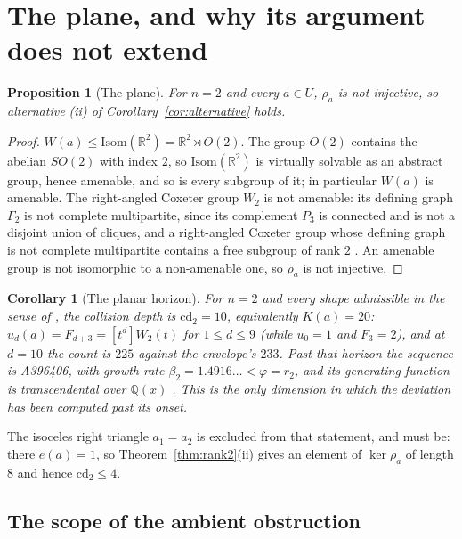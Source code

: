 \documentclass[11pt,a4paper]{article}
\newcommand{\R}{\mathbb{R}}
\newcommand{\Q}{\mathbb{Q}}
\newcommand{\Isom}{\mathrm{Isom}}
\newcommand{\cd}{\mathrm{cd}}
\newtheorem{corollary}[theorem]{Corollary}
\newtheorem{proposition}[theorem]{Proposition}
\theoremstyle{definition}
\theoremstyle{remark}
\theoremstyle{plain}
\begin{document}
\section{The plane, and why its argument does not extend}\label{sec:plane}

\begin{proposition}[The plane]\label{prop:plane}
For $n=2$ and every $a\in U$, $\rho_a$ is not injective, so alternative (ii) of
Corollary~\ref{cor:alternative} holds.
\end{proposition}

\begin{proof}
$W(a)\le\Isom(\R^2)=\R^2\rtimes O(2)$. The group $O(2)$ contains the abelian $SO(2)$ with index
$2$, so $\Isom(\R^2)$ is virtually solvable as an abstract group, hence amenable, and so is
every subgroup of it; in particular $W(a)$ is amenable. The right-angled Coxeter group $W_2$ is
not amenable: its defining graph $\Gamma_2$ is not complete multipartite, since its complement
$P_3$ is connected and is not a disjoint union of cliques, and a right-angled Coxeter group
whose defining graph is not complete multipartite contains a free subgroup of rank $2$
\cite{Davis}. An amenable group is not isomorphic to a non-amenable one, so $\rho_a$ is not
injective.
\end{proof}

\begin{corollary}[The planar horizon]\label{cor:plane}
For $n=2$ and every shape admissible in the sense of \cite{Bonfioli1}, the collision depth is
$\cd_2=10$, equivalently $K(a)=20$: $u_d(a)=F_{d+3}=[t^d]W_2(t)$ for $1\le d\le9$ (while $u_0=1$
and $F_3=2$), and at $d=10$ the count is $225$ against the envelope's $233$. Past that horizon
the sequence is \textup{A396406}, with growth rate $\beta_2=1.4916\ldots<\varphi=r_2$, and its
generating function is transcendental over $\Q(x)$ \cite{Bonfioli2}. This is the only dimension
in which the deviation has been computed past its onset.
\end{corollary}

The isoceles right triangle $a_1=a_2$ is excluded from that statement, and must be: there
$e(a)=1$, so Theorem~\ref{thm:rank2}(ii) gives an element of $\ker\rho_a$ of length $8$ and
hence $\cd_2\le4$.

\subsection{The scope of the ambient obstruction}\label{subsec:barrier}
\end{document}
